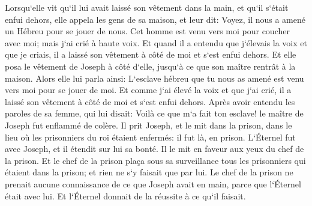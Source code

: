 \verse Lorsqu`elle vit qu`il lui avait laissé son vêtement dans la main, et qu`il s`était enfui dehors, 
\verse elle appela les gens de sa maison, et leur dit: Voyez, il nous a amené un Hébreu pour se jouer de nous. Cet homme est venu vers moi pour coucher avec moi; mais j`ai crié à haute voix. 
\verse Et quand il a entendu que j`élevais la voix et que je criais, il a laissé son vêtement à côté de moi et s`est enfui dehors. 
\verse Et elle posa le vêtement de Joseph à côté d`elle, jusqu`à ce que son maître rentrât à la maison. 
\verse Alors elle lui parla ainsi: L`esclave hébreu que tu nous as amené est venu vers moi pour se jouer de moi. 
\verse Et comme j`ai élevé la voix et que j`ai crié, il a laissé son vêtement à côté de moi et s`est enfui dehors. 
\verse Après avoir entendu les paroles de sa femme, qui lui disait: Voilà ce que m`a fait ton esclave! le maître de Joseph fut enflammé de colère. 
\verse Il prit Joseph, et le mit dans la prison, dans le lieu où les prisonniers du roi étaient enfermés: il fut là, en prison. 
\verse L`Éternel fut avec Joseph, et il étendit sur lui sa bonté. Il le mit en faveur aux yeux du chef de la prison. 
\verse Et le chef de la prison plaça sous sa surveillance tous les prisonniers qui étaient dans la prison; et rien ne s`y faisait que par lui. 
\verse Le chef de la prison ne prenait aucune connaissance de ce que Joseph avait en main, parce que l`Éternel était avec lui. Et l`Éternel donnait de la réussite à ce qu`il faisait. 

